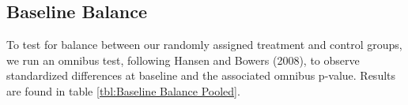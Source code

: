 \documentclass{article}
\begin{document}

% 
% 




\subsection*{Baseline Balance}

To test for balance between our randomly assigned treatment and control groups, we run an omnibus test, following Hansen and Bowers (2008), to observe standardized differences at baseline and the associated omnibus p-value. Results are found in table \ref{tbl:Baseline Balance Pooled}.
\end{document}
